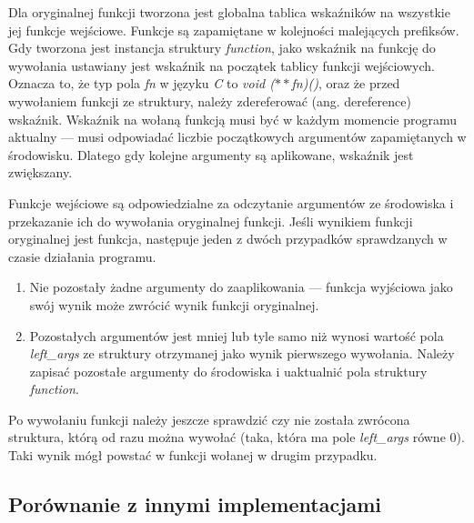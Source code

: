 \documentclass[declaration,shortabstract]{iithesis}
\begin{document}
Dla oryginalnej funkcji tworzona jest globalna tablica wskaźników na wszystkie 
jej funkcje wejściowe. Funkcje są zapamiętane w kolejności malejących prefiksów.
Gdy tworzona jest instancja struktury \textit{function}, jako wskaźnik na 
funkcję do wywołania ustawiany jest wskaźnik na początek tablicy funkcji 
wejściowych. Oznacza to, że typ pola \textit{fn} w języku \textit{C} to 
\textit{void ($\ast\ast$fn)()}, oraz że przed wywołaniem funkcji ze struktury,
należy zdereferować (ang. dereference) wskaźnik. Wskaźnik na wołaną funkcją 
musi być w każdym momencie programu aktualny --- musi odpowiadać liczbie 
początkowych argumentów zapamiętanych w środowisku. Dlatego gdy kolejne 
argumenty są aplikowane, wskaźnik jest zwiększany. 


Funkcje wejściowe są odpowiedzialne za odczytanie argumentów ze środowiska i 
przekazanie ich do wywołania oryginalnej funkcji. Jeśli wynikiem funkcji 
oryginalnej jest funkcja, następuje jeden z dwóch przypadków sprawdzanych w
czasie działania programu.

\begin{enumerate}
  \item Nie pozostały żadne argumenty do zaaplikowania ---
  funkcja wyjściowa jako swój wynik może zwrócić wynik funkcji oryginalnej.
  \item Pozostałych argumentów jest mniej lub tyle samo niż wynosi 
  wartość pola \textit{left\_args} ze struktury otrzymanej jako wynik 
  pierwszego wywołania.
  Należy zapisać pozostałe argumenty do środowiska i uaktualnić pola struktury 
  \textit{function}.
\end{enumerate}

Po wywołaniu funkcji należy jeszcze sprawdzić czy nie została zwrócona 
struktura, którą od razu można wywołać 
(taka, która ma pole \textit{left\_args} 
równe $0$). Taki wynik mógł powstać w funkcji wołanej w drugim przypadku.

\subsection{Porównanie z innymi implementacjami}
\end{document}
